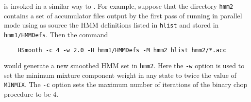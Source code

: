 is invoked in a similar way to .
For example, suppose that the directory \texttt{hmm2} contains a set of
accumulator files output by the first pass of  running in parallel
mode using as source the HMM definitions listed in \texttt{hlist} and 
stored in \texttt{hmm1/HMMDefs}.  Then the command
\begin{verbatim}
    HSmooth -c 4 -w 2.0 -H hmm1/HMMDefs -M hmm2 hlist hmm2/*.acc
\end{verbatim}
would generate a new smoothed HMM set in \texttt{hmm2}.  Here the \texttt{-w}
option is used to set the minimum mixture component weight in any state to
twice the value of \texttt{MINMIX}.  
The \texttt{-c} option sets the maximum
number of iterations of the binary chop procedure to be 4.



